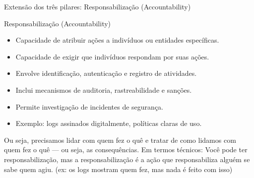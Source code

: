 \begin{frame}{Extensão dos três pilares: Responsabilização (Accountability)}
    \begin{block}{Responsabilização (Accountability)}
        \begin{itemize}
            \item Capacidade de atribuir ações a indivíduos ou entidades específicas.
            \item Capacidade de exigir que indivíduos respondam por suas ações.
            \item Envolve identificação, autenticação e registro de atividades.
            \item Inclui mecanismos de auditoria, rastreabilidade e sanções.
            \item Permite investigação de incidentes de segurança.
                        \item Exemplo: logs assinados digitalmente, políticas claras de uso.
        \end{itemize}
    \end{block}

 
Ou seja, precisamos lidar com quem fez o quê e tratar de como lidamos com quem fez o quê — ou seja, as consequências. Em termos técnicos: Você pode ter responsabilização, mas a responsabilização é a ação que responsabiliza alguém se sabe quem agiu.
(ex: os logs mostram quem fez, mas nada é feito com isso)

\end{frame}

